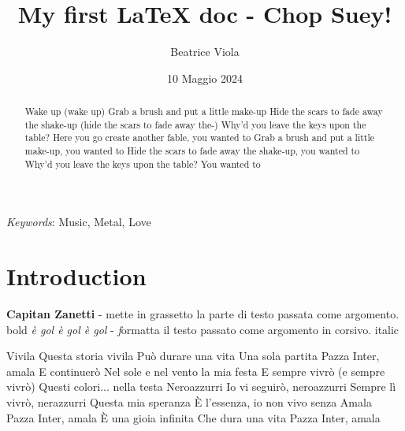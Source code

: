 \documentclass[12pt]{article}
\title{My first LaTeX doc - Chop Suey!}
\author{Beatrice Viola}
\date{10 Maggio 2024} %
\begin{document}

\maketitle %
\tableofcontents %

\begin{abstract}
 Wake up (wake up)
Grab a brush and put a little make-up
Hide the scars to fade away the shake-up (hide the scars to fade away the-)
Why'd you leave the keys upon the table?
Here you go create another fable, you wanted to
Grab a brush and put a little make-up, you wanted to
Hide the scars to fade away the shake-up, you wanted to
Why'd you leave the keys upon the table? You wanted to
\end{abstract}

\bigskip %

\textit{Keywords}: Music, Metal, Love %

\section{Introduction} %
\label{sec:intro} %

\textbf{Capitan Zanetti} - \textb mette in grassetto la parte di testo passata come argomento. bold
\textit{è gol è gol è gol} - \textit formatta il testo passato come argomento in corsivo. italic

Vivila Questa storia vivila Può durare una vita
Una sola partita Pazza Inter, amala
E continuerò Nel sole e nel vento la mia festa
E sempre vivrò (e sempre vivrò) Questi colori... nella testa
Neroazzurri Io vi seguirò, neroazzurri
Sempre lì vivrò, nerazzurri Questa mia speranza
È l'essenza, io non vivo senza
Amala Pazza Inter, amala
È una gioia infinita Che dura una vita
Pazza Inter, amala
\cite{Aloisi23} %
\citep{Aloisi23} %
\citet{LaLoggia2024} %
\smallskip
\end{document}
